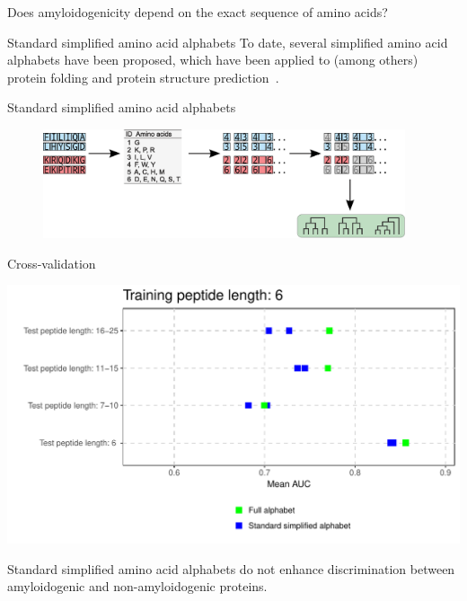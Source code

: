\documentclass{beamer}\usepackage[]{graphicx}\usepackage[]{color}
\makeatletter
\def\maxwidth{ %
  \ifdim\Gin@nat@width>\linewidth
    \linewidth
  \else
    \Gin@nat@width
  \fi
}
\newenvironment{knitrout}{}{} %
\makeatother
\begin{document}
\begin{frame}
  Does amyloidogenicity depend on the exact sequence of amino acids?
  \end{frame}

\begin{frame}{Standard simplified amino acid alphabets}
To date, several simplified amino acid alphabets have been proposed, which have been applied to (among others) protein folding and protein structure prediction~\citep{kosiol_new_2004, melo_accuracy_2006}.
  \end{frame}
  
    \begin{frame}{Standard simplified amino acid alphabets}
\begin{figure} 
\includegraphics[width=0.95\textwidth]{static_figure/ngram2.eps}
\end{figure}


  \end{frame}


    \begin{frame}{Cross-validation}
\begin{knitrout}
\color{fgcolor}

{\centering \includegraphics[width=\maxwidth]{figure/unnamed-chunk-10-1} 

}



\end{knitrout}

Standard simplified amino acid alphabets do not enhance discrimination between amyloidogenic and non-amyloidogenic proteins.
  
  \end{frame}
\end{document}

